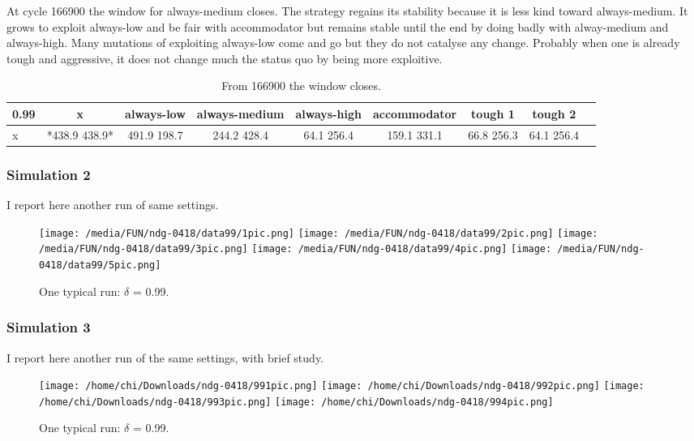 \documentclass[12.5pt]{report}
\begin{document}
At cycle 166900 the window for always-medium closes. The strategy regains its stability because it is less kind toward always-medium. It grows to exploit always-low and be fair with accommodator but remains stable until the end by doing badly with alway-medium and always-high. Many mutations of exploiting always-low come and go but they do not catalyse any change. Probably when one is already tough and aggressive, it does not change much the status quo by being more exploitive.

\begin{table}[h!]
\center
\begin{tabular}{l|cccccccc}
\textbf{0.99}& x & always-low & always-medium & always-high & accommodator &tough 1 & tough 2\\
\hline
x& *438.9 438.9* &  491.9 198.7  &  244.2 428.4   & 64.1 256.4 &    159.1 331.1 &   66.8 256.3 &    64.1 256.4\\

\end{tabular}
\caption{From 166900 the window closes.}
\end{table}



\subsubsection{Simulation 2}

I report here another run of same settings.

\begin{figure}
\texttt{[image: /media/FUN/ndg-0418/data99/1pic.png]}
\texttt{[image: /media/FUN/ndg-0418/data99/2pic.png]}
\texttt{[image: /media/FUN/ndg-0418/data99/3pic.png]}
\texttt{[image: /media/FUN/ndg-0418/data99/4pic.png]}
\texttt{[image: /media/FUN/ndg-0418/data99/5pic.png]}
\caption{One typical run: $\delta$ = 0.99.}
\end{figure}


\subsubsection{Simulation 3}

I report here another run of the same settings, with brief study.

\begin{figure}

\texttt{[image: /home/chi/Downloads/ndg-0418/991pic.png]}
\texttt{[image: /home/chi/Downloads/ndg-0418/992pic.png]}
\texttt{[image: /home/chi/Downloads/ndg-0418/993pic.png]}
\texttt{[image: /home/chi/Downloads/ndg-0418/994pic.png]}

\caption{One typical run: $\delta$ = 0.99.}
\end{figure}
\end{document}

